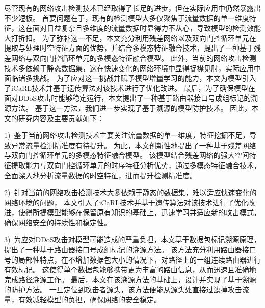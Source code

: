
尽管现有的网络攻击检测技术已经取得了长足的进步，但在实际应用中仍然暴露出不少短板。
首要问题在于，现有的检测模型大多仅聚焦于流量数据的单一维度特征，这在面对日益复杂且多维度的流量数据时显得力不从心，导致模型的检测效能大打折扣。
为了弥补这一不足，本文充分利用残差网络以及双向门控循环单元在提取与处理时空特征方面的优势，并结合多模态特征融合技术，提出了一种基于残差网络与双向门控循环单元的多模态特征融合模型。
此外，当前的网络攻击检测技术多依赖于静态数据集，这在快速变化的网络环境中显得捉襟见肘，实际应用中面临诸多挑战。
为了应对这一挑战并赋予模型增量学习的能力，本文为模型引入了iCaRL技术并基于遗传算法对该技术进行了优化改进。
最后，为了确保模型在面对DDoS攻击时能够稳定运行，本文提出了一种基于路由器接口号成组标记的溯源方法。
基于这一方法，我们进一步实现了基于溯源的模型防护技术。
因此，本文的研究内容及主要贡献如下：\par

1)~鉴于当前网络攻击检测技术主要关注流量数据的单一维度，特征挖掘不足，导致异常流量检测精准度有待提升。
为此，本文创新性地提出了一种基于残差网络与双向门控循环单元的多模态特征融合模型。
该模型结合残差网络的强大空间特征提取能力与双向门控循环单元的时序特征分析优势，通过多模态特征融合技术，全面深入地分析流量数据的时空特征，进而提升检测精准度。\par

2)~针对当前的网络攻击检测技术大多依赖于静态的数据集，难以适应快速变化的网络环境的问题，
本文引入了iCaRL技术并基于遗传算法对该技术进行了优化改进，使得所提模型能够在保留原有知识的基础上，迅速学习并适应新的攻击模式，确保网络安全的持续性和稳定性。\par

3)~为应对DDoS攻击对模型可能造成的严重负担，本文基于数据包标记溯源原理，提出了一种基于路由器接口号成组标记的溯源方法。
该方法充分利用路由器接口号的局部性特点，在不增加数据包大小的情况下，对路径上的一组连续路由器进行有效标记。             
这使得单个数据包能够携带更为丰富的路由信息，从而迅速且准确地完成路径溯源工作。
最后，本文在该溯源方法的基础上，设计并实现了基于溯源的防护方法。
一旦定位到攻击者源头，该方法便能从源头处直接过滤掉攻击流量，有效减轻模型的负担，确保网络的安全稳定。\par

